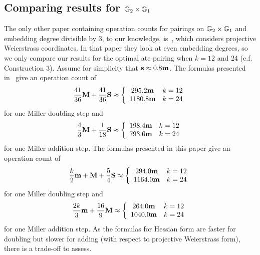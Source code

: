 \subsection{Comparing results for $\mathbb{G}_{2} \times \mathbb{G}_{1}$}

The only other paper containing operation counts for pairings on $\mathbb{G}_{2} \times \mathbb{G}_{1}$
and embedding degree divisible by 3, to our knowledge, is~\cite{2009/craig}, which considers projective Weierstrass coordinates.
In that paper they look at even embedding degrees, so we only compare our results
for the optimal ate pairing when $k=12$ and 24 (c.f. Construction 3).
Assume for simplicity that $\textbf{s} \approx 0.8\textbf{m}$.
The formulas presented in~\cite{2009/craig} give an operation count of
$$\frac{41}{36}\textbf{M} + \frac{41}{36}\textbf{S} \approx
\left\{ \begin{array}{cc}
295.2\textbf{m} & k=12 \\
1180.8\textbf{m} & k=24
\end{array} \right.$$ 
for one Miller doubling step
and
$$\frac{4}{3}\textbf{M} + \frac{1}{18}\textbf{S} \approx
\left\{ \begin{array}{cc}
198.4\textbf{m} & k=12 \\
793.6\textbf{m} & k=24
\end{array} \right.$$ 
for one Miller addition step.
The formulas presented in this paper give an operation count of
$$\frac{k}{2}\textbf{m} + \textbf{M} + \frac{5}{4}\textbf{S} \approx
\left\{ \begin{array}{cc}
294.0\textbf{m} & k=12 \\
1164.0\textbf{m} & k=24
\end{array} \right.$$ 
for one Miller doubling step
and
$$\frac{2k}{3}\textbf{m} + \frac{16}{9}\textbf{M} \approx
\left\{ \begin{array}{cc}
264.0\textbf{m} & k=12 \\
1040.0\textbf{m} & k=24
\end{array} \right.$$ 
for one Miller addition step.
As the formulas for Hessian form are faster for doubling but slower for adding (with respect to projective Weierstrass form), there is a trade-off to assess.

